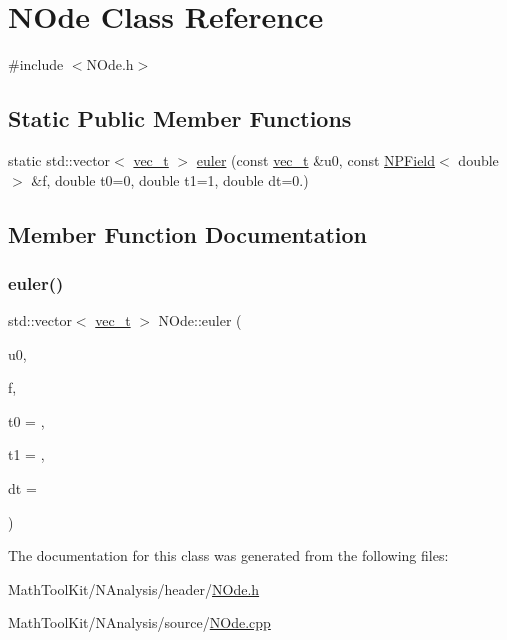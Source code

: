 \hypertarget{class_n_ode}{}\section{N\+Ode Class Reference}
\label{class_n_ode}


{\ttfamily \#include $<$N\+Ode.\+h$>$}

\subsection*{Static Public Member Functions}
\begin{DoxyCompactItemize}
\item 
static std\+::vector$<$ \mbox{\hyperlink{group___n_algebra_ga0a2cfc67e738a3d73e4f12098c4c07f6}{vec\+\_\+t}} $>$ \mbox{\hyperlink{class_n_ode_aba64ed3eb2ec85a138556d57fc20cdfd}{euler}} (const \mbox{\hyperlink{group___n_algebra_ga0a2cfc67e738a3d73e4f12098c4c07f6}{vec\+\_\+t}} \&u0, const \mbox{\hyperlink{class_n_p_field}{N\+P\+Field}}$<$ double $>$ \&f, double t0=0, double t1=1, double dt=0.)
\end{DoxyCompactItemize}


\subsection{Member Function Documentation}
\mbox{\label{class_n_ode_aba64ed3eb2ec85a138556d57fc20cdfd}} 
\subsubsection{\texorpdfstring{euler()}{euler()}}
{\footnotesize\ttfamily std\+::vector$<$ \mbox{\hyperlink{group___n_algebra_ga0a2cfc67e738a3d73e4f12098c4c07f6}{vec\+\_\+t}} $>$ N\+Ode\+::euler (\begin{DoxyParamCaption}\item[{const \mbox{\hyperlink{group___n_algebra_ga0a2cfc67e738a3d73e4f12098c4c07f6}{vec\+\_\+t}} \&}]{u0,  }\item[{const \mbox{\hyperlink{class_n_p_field}{N\+P\+Field}}$<$ double $>$ \&}]{f,  }\item[{double}]{t0 = {},  }\item[{double}]{t1 = {},  }\item[{double}]{dt = {} }\end{DoxyParamCaption})\hspace{0.3cm}{\ttfamily [static]}}



The documentation for this class was generated from the following files\+:\begin{DoxyCompactItemize}
\item 
Math\+Tool\+Kit/\+N\+Analysis/header/\mbox{\hyperlink{_n_ode_8h}{N\+Ode.\+h}}\item 
Math\+Tool\+Kit/\+N\+Analysis/source/\mbox{\hyperlink{_n_ode_8cpp}{N\+Ode.\+cpp}}\end{DoxyCompactItemize}
